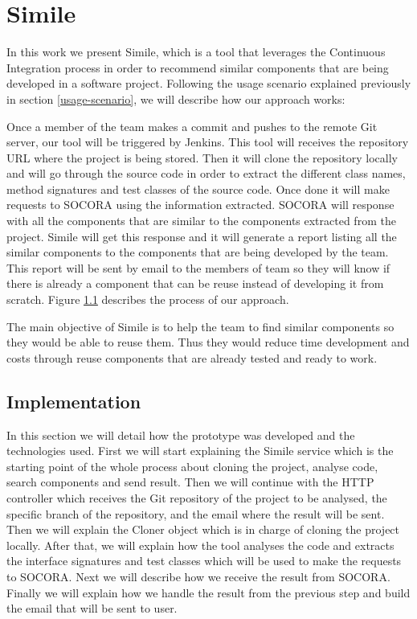 \chapter{Simile }
\label{chap:simile}

In this work we present Simile, which is a tool that leverages the Continuous Integration process in order to recommend similar components that are being developed in a software project. Following the usage scenario explained previously in section \ref{usage-scenario}, we will describe how our approach works:

Once a member of the team makes a commit and pushes to the remote Git server, our tool will be triggered by Jenkins. This tool will receives the repository URL where the project is being stored. Then it will clone the repository locally and will go through the source code in order to extract the different class names, method signatures and test classes of the source code. Once done it will make requests to SOCORA using the information extracted. SOCORA will response with all the components that are similar to the components extracted from the project. Simile will get this response and it will generate a report listing all the similar components to the components that are being developed by the team. This report will be sent by email to the members of team so they will know if there is already a component that can be reuse instead of developing it from scratch. Figure \ref{} describes the process of our approach.

The main objective of Simile is to help the team to find similar components so they would be able to reuse them. Thus they would reduce time development and costs through reuse components that are already tested and ready to work.

\section{Implementation}
In this section we will detail how the prototype was developed and the technologies used. First we will start explaining the Simile service which is the starting point of the whole process about cloning the project, analyse code, search components and send result. Then we will continue with the  HTTP controller which receives the Git repository of the project to be analysed, the specific branch of the repository, and the email where the result will be sent. Then we will explain the Cloner object which is in charge of cloning the project locally. After that, we will explain how the tool analyses the code and extracts the interface signatures and test classes which will be used to make the requests to SOCORA. Next we will describe how we receive the result from SOCORA. Finally we will explain how we handle the result from the previous step and build the email that will be sent to user.

